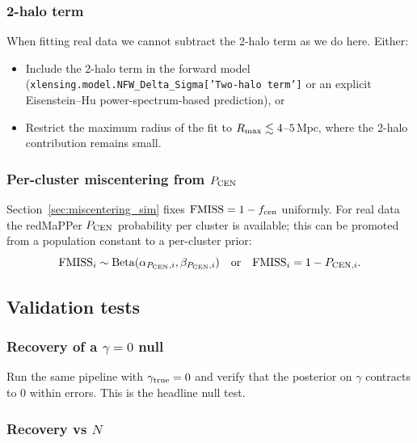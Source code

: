 \documentclass[11pt,a4paper]{article}
\newcommand{\fcen}{f_{\rm cen}}
\begin{document}
\subsubsection*{2-halo term}

When fitting real data we cannot subtract the 2-halo term as we do here.
Either:
\begin{itemize}[noitemsep]
  \item Include the 2-halo term in the forward model
        (\texttt{xlensing.model.NFW\_Delta\_Sigma['Two-halo term']} or an
        explicit Eisenstein--Hu power-spectrum-based prediction), or
  \item Restrict the maximum radius of the fit to $R_{\rm max} \lesssim
        4$--$5\,\mathrm{Mpc}$, where the 2-halo contribution remains small.
\end{itemize}

\subsubsection*{Per-cluster miscentering from $P_{\rm CEN}$}

Section~\ref{sec:miscentering_sim} fixes
$\mathrm{FMISS}=1-\fcen$ uniformly.  For real data the redMaPPer
$P_{\rm CEN}$ probability per cluster is available; this can be promoted from
a population constant to a per-cluster prior:
\begin{equation}
  \mathrm{FMISS}_i \sim \mathrm{Beta}(\alpha_{P_{\rm CEN},i}, \beta_{P_{\rm CEN},i})
  \quad\mathrm{or}\quad \mathrm{FMISS}_i = 1 - P_{{\rm CEN},i}.
\end{equation}

\subsection{Validation tests}

\subsubsection*{Recovery of a $\gamma = 0$ null}

Run the same pipeline with $\gamma_{\rm true} = 0$ and verify that the
posterior on $\gamma$ contracts to $0$ within errors.  This is the headline
null test.

\subsubsection*{Recovery vs $N$}
\end{document}
